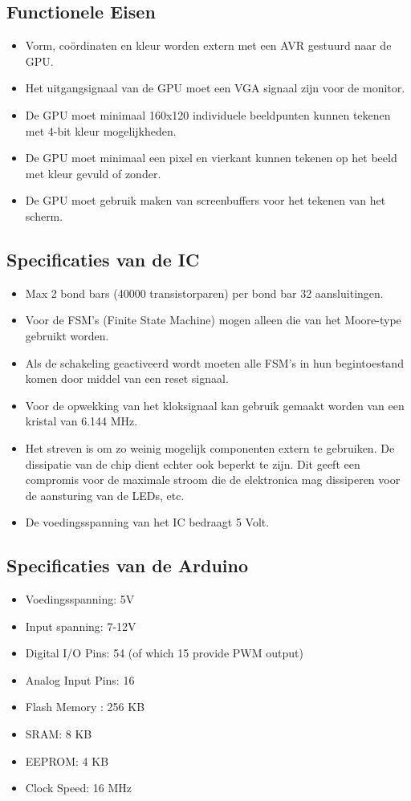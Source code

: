 
\subsection {Functionele Eisen}
\begin {itemize}
\item Vorm, coördinaten en kleur worden extern met een AVR gestuurd naar de GPU.
\item Het uitgangsignaal van de GPU moet een VGA signaal zijn voor de monitor. 
\item De GPU moet minimaal 160x120 individuele beeldpunten kunnen tekenen met 4-bit kleur mogelijkheden.
\item De GPU moet minimaal een pixel en vierkant kunnen tekenen op het beeld met kleur gevuld of zonder.
\item De GPU moet gebruik maken van screenbuffers voor het tekenen van het scherm.
\end{itemize}


\subsection {Specificaties van de IC}
\begin {itemize}
\item Max 2 bond bars (40000 transistorparen) per bond bar 32 aansluitingen.
\item Voor de FSM’s (Finite State Machine) mogen alleen die van het Moore-type gebruikt worden.
\item Als de schakeling geactiveerd wordt moeten alle FSM’s in hun begintoestand komen door middel van een reset signaal.
\item Voor de opwekking van het kloksignaal kan gebruik gemaakt worden van een kristal van 6.144 MHz.
\item Het streven is om zo weinig mogelijk componenten extern te gebruiken. De dissipatie van de
chip dient echter ook beperkt te zijn. Dit geeft een compromis voor de maximale stroom die de elektronica mag dissiperen voor de aansturing van de LEDs, etc.
\item De voedingsspanning van het IC bedraagt 5 Volt.
\end{itemize}

\subsection {Specificaties van de Arduino}
\begin {itemize}
\item Voedingsspanning:	 5V
\item Input spanning: 	7-12V
\item Digital I/O Pins: 	54 (of which 15 provide PWM output)
\item Analog Input Pins:	16
\item Flash Memory	:	256 KB 
\item SRAM:			8 KB
\item EEPROM:		4 KB
\item Clock Speed:		16 MHz
\end {itemize}